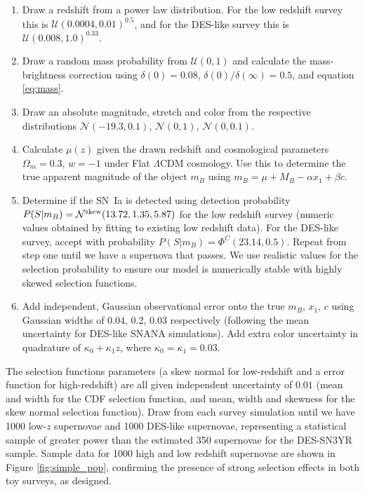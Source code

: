 \documentclass[twocolumn,trackchanges,tighten]{aastex62}
\begin{document}
\begin{enumerate}[1.]
	\item Draw a redshift from a power law distribution. For the low redshift survey this is $\mathcal{U}(0.0004, 0.01)^{0.5}$, and for the DES-like survey this is $\mathcal{U}(0.008, 1.0)^{0.33}$. 
	\item Draw a random mass probability from $\mathcal{U}(0, 1)$ and calculate the mass-brightness correction using $\delta(0) = 0.08$, $\delta(0)/\delta(\infty) = 0.5$, and equation \eqref{eq:mass}.
	\item Draw an absolute magnitude, stretch and color from the respective distributions $\mathcal{N}(-19.3, 0.1)$, $\mathcal{N}(0, 1)$, $\mathcal{N}(0, 0.1)$.
	\item Calculate $\mu(z)$ given the drawn redshift and cosmological parameters $\Omega_m = 0.3$, $w = -1$ under Flat $\Lambda$CDM cosmology. Use this to determine the true apparent magnitude of the object $m_B$ using $m_B = \mu + M_B - \alpha x_1 + \beta c$.
	\item Determine if the SN~Ia is detected using detection probability $P(S|m_B) = \mathcal{N}^{\rm skew}(13.72, 1.35, 5.87)$ for the low redshift survey (numeric values obtained by fitting to existing low redshift data). For the DES-like survey, accept with probability $P(S|m_B) = \Phi^C(23.14, 0.5)$. Repeat from step one until we have a supernova that passes. We use realistic values for the selection probability to ensure our model is numerically stable with highly skewed selection functions.
	\item Add independent, Gaussian observational error onto the true $m_B$, $x_1$, $c$ using Gaussian widths of $0.04$, $0.2$, $0.03$ respectively (following the mean uncertainty for DES-like SNANA simulations). Add extra color uncertainty in quadrature of $\kappa_0 + \kappa_1 z$, where $\kappa_0 = \kappa_1 = 0.03$.
\end{enumerate}

The selection functions parameters (a skew normal for low-redshift and a  error function for high-redshift) are all given independent uncertainty of $0.01$ (mean and width for the CDF selection function, and mean, width and skewness for the skew normal selection function). Draw from each survey simulation until we have 1000 low-$z$ supernovae and 1000 DES-like supernovae, representing a statistical sample of greater power than the estimated 350 supernovae for the DES-SN3YR sample. Sample data for 1000 high and low redshift supernovae are shown in Figure \ref{fig:simple_pop}, confirming the presence of strong selection effects in both toy surveys, as designed. 
\end{document}
